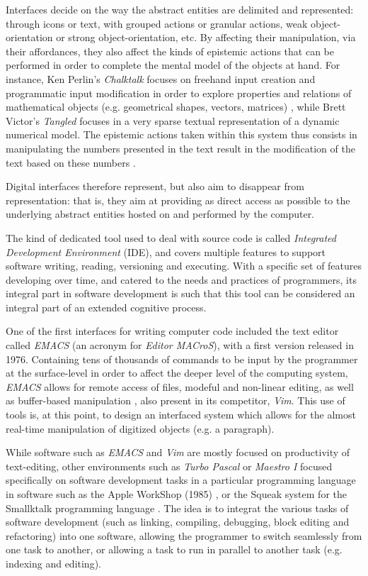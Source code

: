 Interfaces decide on the way the abstract entities are delimited and represented: through icons or text, with grouped actions or granular actions, weak object-orientation or strong object-orientation, etc. By affecting their manipulation, via their affordances, they also affect the kinds of epistemic actions that can be performed in order to complete the mental model of the objects at hand. For instance, Ken Perlin's \emph{Chalktalk} focuses on freehand input creation and programmatic input modification in order to explore properties and relations of mathematical objects (e.g. geometrical shapes, vectors, matrices) \citep{perlin_chalktalk_2022}, while Brett Victor's \emph{Tangled} focuses in a very sparse textual representation of a dynamic numerical model. The epistemic actions taken within this system thus consists in manipulating the numbers presented in the text result in the modification of the text based on these numbers \citep{victor_tangle_2011,victor_explorable_2011}.

Digital interfaces therefore represent, but also aim to disappear from representation: that is, they aim at providing as direct access as possible to the underlying abstract entities hosted on and performed by the computer.

The kind of dedicated tool used to deal with source code is called \emph{Integrated Development Environment} (IDE), and covers multiple features to support software writing, reading, versioning and executing. With a specific set of features developing over time, and catered to the needs and practices of programmers, its integral part in software development is such that this tool can be considered an integral part of an extended cognitive process.

One of the first interfaces for writing computer code included the text editor called \emph{EMACS} (an acronym for \emph{Editor MACroS}), with a first version released in 1976. Containing tens of thousands of commands to be input by the programmer at the surface-level in order to affect the deeper level of the computing system, \emph{EMACS} allows for remote access of files, modeful and non-linear editing, as well as buffer-based manipulation \citep{greenberg_multics_1996}, also present in its competitor, \emph{Vim}. This use of tools is, at this point, to design an interfaced system which allows for the almost real-time manipulation of digitized objects (e.g. a paragraph).

While software such as \emph{EMACS} and \emph{Vim} are mostly focused on productivity of text-editing, other environments such as \emph{Turbo Pascal} or \emph{Maestro I} focused specifically on software development tasks in a particular programming language in software such as the Apple WorkShop (1985) \citep{west_macintosh_1987}, or the Squeak system for the Smallktalk programming language \citep{ingalls_back_1997}. The idea is to integrat the various tasks of software development (such as linking, compiling, debugging, block editing and refactoring) into one software, allowing the programmer to switch seamlessly from one task to another, or allowing a task to run in parallel to another task (e.g. indexing and editing).

